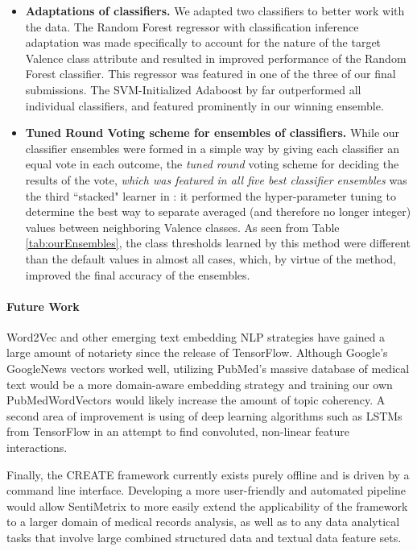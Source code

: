 \begin{itemize}
\item \textbf{Adaptations of classifiers.} We adapted two classifiers
to better work with the data. The \textsf{Random Forest regressor with classification
inference} adaptation was made specifically to account for the nature
of the target \textsf{Valence} class attribute and resulted in improved
performance of the Random Forest classifier. This regressor was featured
in one of the three of our final submissions.  The 
\textsf{SVM-Initialized Adaboost} by far outperformed all individual
classifiers, and featured prominently in our winning ensemble.


\item \textbf{Tuned Round Voting scheme for ensembles of classifiers.} While
our classifier ensembles were formed in a simple way by giving each classifier
an equal vote in each outcome, the \textit{tuned round} voting scheme for
deciding the results of the vote, \textit{which was featured in all five
best classifier ensembles} was the third ``stacked" learner in \CREATE:
it performed the hyper-parameter tuning to determine the best
way to separate averaged (and therefore no longer integer) values
between neighboring \textsf{Valence} classes. As seen
from Table \ref{tab:ourEnsembles}, the class thresholds learned 
by this method were different than the default values in almost all
cases, which, by virtue of the method, improved the final accuracy of
the ensembles.

\end{itemize}


\paragraph{Future Work} \textsf{Word2Vec} and other emerging text embedding NLP strategies have gained a large amount of notariety since the release of TensorFlow. Although Google's \textsf{GoogleNews} vectors worked well, utilizing PubMed's massive database of medical text would be a more domain-aware embedding strategy and training our own \textsf{PubMedWordVectors} would likely increase the amount of topic coherency. A second area of improvement is using of deep learning algorithms such as \textsf{LSTMs} from TensorFlow in an attempt to find convoluted, non-linear feature interactions. 

Finally, the CREATE framework currently exists purely offline and is driven by a command line interface. Developing a more user-friendly and automated pipeline would allow SentiMetrix to more easily extend the applicability of the framework to a larger domain of medical records
analysis, as well as to any data analytical tasks that involve large combined structured data and textual data feature sets.
